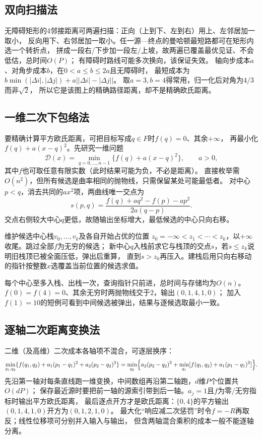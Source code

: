 \subsection{双向扫描法}
无障碍矩形的4邻接距离可两遍扫描：正向（上到下、左到右）用上、左邻居加一取小，
反向用下、右邻居加一取小。任一源—终点的曼哈顿最短路都可在矩形内选一个转折点，
拼成一段右/下步加一段左/上坡，故两遍已覆盖最优见证、不会低估，总时间$O(P)$；
有障碍时路线可能多次换向，该保证失效。
轴向步成本$a$、对角步成本$b$，在$0<a\leq b\leq2a$且无障碍时，
最短成本为$b\min(|\Delta i|,|\Delta j|)+a\bigl||\Delta i|-|\Delta j|\bigr|$。
取$a=3,b=4$得常用，归一化后对角为$4/3$而非$\sqrt2$，
所以它是该图上的精确路径距离，却不是精确欧氏距离。

\subsection{一维二次下包络法}
\label{sec:graph-quadratic-distance}
要精确计算平方欧氏距离，可把目标写成$q\in F$时$f(q)=0$、其余$+\infty$，
再最小化$f(q)+a(x-q)^2$。先研究一维问题
\begin{equation}
  \mathcal D(x)=\min_{q=0,\ldots,n-1}\{f(q)+a(x-q)^2\},\qquad a>0,
  \label{eq:graph-quadratic-distance-transform}
\end{equation}
其中$f$也可取任意有限实数（此时结果可能为负，不必是距离）。
直接枚举需$O(n^2)$，但所有候选是曲率相同的抛物线，只需保留某处可能最低者。
对中心$p<q$，消去共同的$ax^2$项，两曲线唯一交点为
\begin{equation}
  s(p,q)=\frac{f(q)+aq^2-f(p)-ap^2}{2a(q-p)}.
  \label{eq:graph-parabola-intersection}
\end{equation}
交点右侧较大中心$q$更低，故随输出坐标增大，最低候选的中心只向右移。
\begin{algorithm}[抛物线下包络]
  维护候选中心栈$v_0,\ldots,v_k$及各自开始占优的位置
  $z_0=-\infty<z_1<\cdots<z_k$，以$+\infty$收尾。跳过全部$f$为无穷的候选；
  新中心$q$入栈前求它与栈顶的交点$s$，若$s\leq z_k$说明旧栈顶已被全面压低，弹出后重算，
  直到$s>z_k$再压入。建栈后用只向右移动的指针按整数$x$选覆盖当前位置的候选求值。
\end{algorithm}
每个中心至多入栈、出栈一次，查询指针只前进，总时间与存储均为$O(n)$。
$f(0)=f(4)=0$、其余无穷时两抛物线交于$2$，输出$(0,1,4,1,0)$；
加入$f(1)=10$的短例可看到中间候选被弹出，结果与逐候选取最小一致。

\subsection{逐轴二次距离变换法}
二维（及高维）二次成本各轴项不混合，可逐层换序：
\[
  \min_{q_1,q_2}\{f(q_1,q_2)+a_1(p_1-q_1)^2+a_2(p_2-q_2)^2\}
  =\min_{q_2}\Bigl\{a_2(p_2-q_2)^2+
    \min_{q_1}[f(q_1,q_2)+a_1(p_1-q_1)^2]\Bigr\}.
\]
先沿第一轴对每条直线跑一维变换，中间数组再沿第二轴跑，$d$维$P$个位置共$O(dP)$；
保存最近源时要把前一轴的源索引带到后一轴。$a_j=1$且$f$为零/无穷指标时输出平方欧氏距离，
最后逐点开方才是欧氏距离：$\{0,4\}$的平方输出$(0,1,4,1,0)$开方为$(0,1,2,1,0)$。
最大化“响应减二次惩罚”时令$f=-R$再取反；线性位移项可分别并入输入与输出，
但含两轴混合乘积的成本一般不能逐轴分离。

